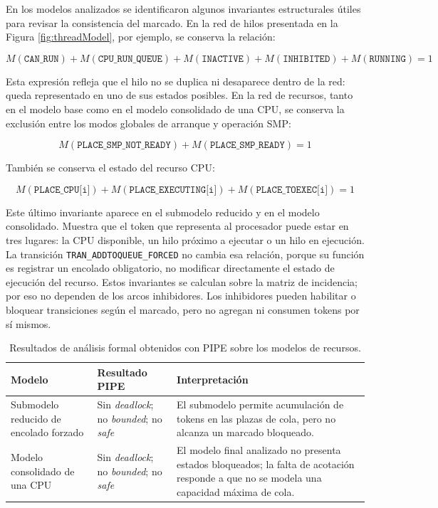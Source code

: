 En los modelos analizados se identificaron algunos invariantes estructurales útiles para revisar la consistencia del marcado. En la red de hilos presentada en la Figura \ref{fig:threadModel}, por ejemplo, se conserva la relación:

\[
M(\texttt{CAN\_RUN}) +
M(\texttt{CPU\_RUN\_QUEUE}) +
M(\texttt{INACTIVE}) +
M(\texttt{INHIBITED}) +
M(\texttt{RUNNING}) = 1
\]

Esta expresión refleja que el hilo no se duplica ni desaparece dentro de la red: queda representado en uno de sus estados posibles. En la red de recursos, tanto en el modelo base como en el modelo consolidado de una CPU, se conserva la exclusión entre los modos globales de arranque y operación SMP:

\[
M(\texttt{PLACE\_SMP\_NOT\_READY}) +
M(\texttt{PLACE\_SMP\_READY}) = 1
\]

También se conserva el estado del recurso CPU:

\[
M(\texttt{PLACE\_CPU[i]}) +
M(\texttt{PLACE\_EXECUTING[i]}) +
M(\texttt{PLACE\_TOEXEC[i]}) = 1
\]

Este último invariante aparece en el submodelo reducido y en el modelo consolidado. Muestra que el token que representa al procesador puede estar en tres lugares: la CPU disponible, un hilo próximo a ejecutar o un hilo en ejecución. La transición \verb|TRAN_ADDTOQUEUE_FORCED| no cambia esa relación, porque su función es registrar un encolado obligatorio, no modificar directamente el estado de ejecución del recurso. Estos invariantes se calculan sobre la matriz de incidencia; por eso no dependen de los arcos inhibidores. Los inhibidores pueden habilitar o bloquear transiciones según el marcado, pero no agregan ni consumen tokens por sí mismos.\par

\begin{table}[H]
    \centering
    \begin{tabular}{|p{}|p{}|p{}|}
        \hline
        \textbf{Modelo} & \textbf{Resultado PIPE} & \textbf{Interpretación} \\
        \hline
        Submodelo reducido de encolado forzado & Sin \textit{deadlock}; no \textit{bounded}; no \textit{safe} & El submodelo permite acumulación de tokens en las plazas de cola, pero no alcanza un marcado bloqueado. \\
        \hline
        Modelo consolidado de una CPU & Sin \textit{deadlock}; no \textit{bounded}; no \textit{safe} & El modelo final analizado no presenta estados bloqueados; la falta de acotación responde a que no se modela una capacidad máxima de cola. \\
        \hline
    \end{tabular}
    \caption{Resultados de análisis formal obtenidos con PIPE sobre los modelos de recursos.}
    \label{tabla:pipe-analisis-formal}
\end{table}

